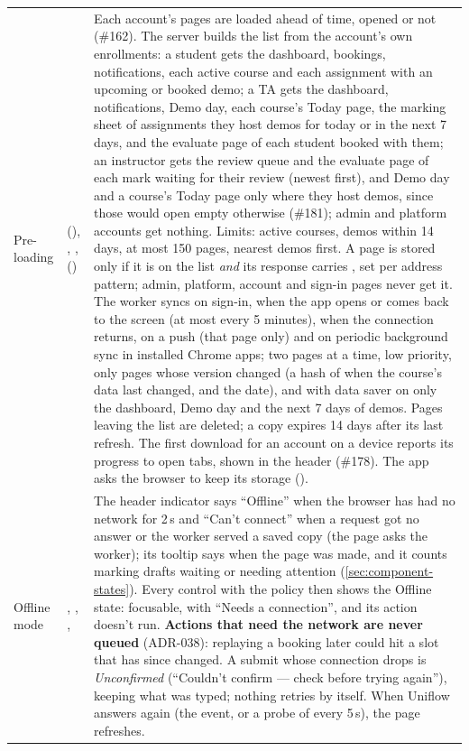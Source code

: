 {\begin{xltabular}{\linewidth}{@{}P{30mm} P{30mm} L@{}}
  Pre-loading &  (), , ,  () & Each account's pages are loaded ahead of time, opened or not (\#162). The server builds the list from the account's own enrollments: a student gets the dashboard, bookings, notifications, each active course and each assignment with an upcoming or booked demo; a TA gets the dashboard, notifications, Demo day, each course's Today page, the marking sheet of assignments they host demos for today or in the next 7 days, and the evaluate page of each student booked with them; an instructor gets the review queue and the evaluate page of each mark waiting for their review (newest first), and Demo day and a course's Today page only where they host demos, since those would open empty otherwise (\#181); admin and platform accounts get nothing. Limits: active courses, demos within 14 days, at most 150 pages, nearest demos first. A page is stored only if it is on the list \emph{and} its response carries , set per address pattern; admin, platform, account and sign-in pages never get it. The worker syncs on sign-in, when the app opens or comes back to the screen (at most every 5 minutes), when the connection returns, on a push (that page only) and on periodic background sync in installed Chrome apps; two pages at a time, low priority, only pages whose version changed (a hash of when the course's data last changed, and the date), and with data saver on only the dashboard, Demo day and the next 7 days of demos. Pages leaving the list are deleted; a copy expires 14 days after its last refresh. The first download for an account on a device reports its progress to open tabs, shown in the header (\#178). The app asks the browser to keep its storage ().\\
  Offline mode & , , ,  & The header indicator says ``Offline'' when the browser has had no network for 2\,s and ``Can't connect'' when a request got no answer or the worker served a saved copy (the page asks the worker); its tooltip says when the page was made, and it counts marking drafts waiting or needing attention (\cref{sec:component-states}). Every control with the  policy then shows the Offline state: focusable, with ``Needs a connection'', and its action doesn't run. \textbf{Actions that need the network are never queued} (ADR-038): replaying a booking later could hit a slot that has since changed. A submit whose connection drops is \emph{Unconfirmed} (``Couldn't confirm --- check before trying again''), keeping what was typed; nothing retries by itself. When Uniflow answers again (the  event, or a probe of  every 5\,s), the page refreshes.\\

\end{xltabular}}

